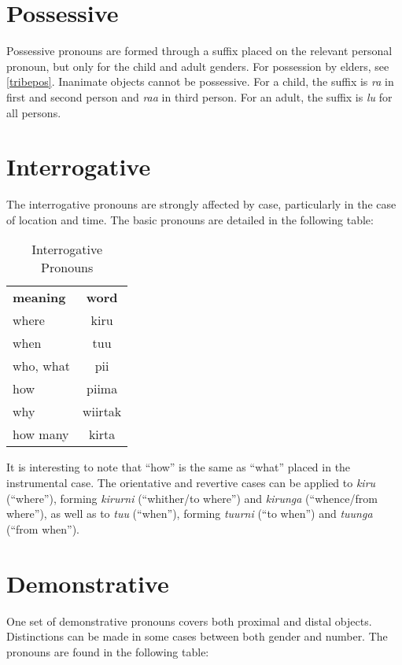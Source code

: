 \section{Possessive}

Possessive pronouns are formed through a suffix placed on the relevant personal
pronoun, but only for the child and adult genders. For possession by elders, see
\ref{tribepos}. Inanimate objects cannot be possessive. For a child, the suffix
is \textit{ra} in first and second person and \textit{raa} in third person. For
an adult, the suffix is \textit{lu} for all persons.

\section{Interrogative}

The interrogative pronouns are strongly affected by case, particularly in the
case of location and time. The basic pronouns are detailed in the following
table:

\begin{table}[h]
\centering
\begin{tabular}{lc}
 \textbf{meaning} & \textbf{word}\\
 where & kiru\\
 when & tuu\\
 who, what & pii\\
 how & piima\\
 why & wiirtak\\
 how many & kirta\\
\end{tabular}
\caption{Interrogative Pronouns}
\end{table}

It is interesting to note that ``how'' is the same as ``what'' placed in the
instrumental case. The orientative and revertive cases can be applied to
\textit{kiru} (``where''), forming \textit{kirurni} (``whither/to where'') and
\textit{kirunga} (``whence/from where''), as well as to \textit{tuu} (``when''),
forming \textit{tuurni} (``to when'') and \textit{tuunga} (``from when'').

\section{Demonstrative}

One set of demonstrative pronouns covers both proximal and distal objects.
Distinctions can be made in some cases between both gender and number. The
pronouns are found in the following table:

